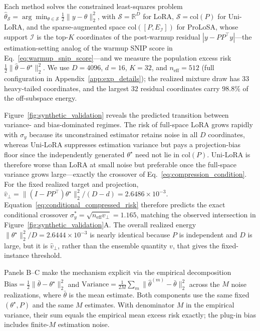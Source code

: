 Each method solves the constrained least-squares problem
\(\hat{\theta}_{\mathcal S}=\arg\min_{\theta\in\mathcal S}\frac{1}{2}\|y-\theta\|_2^2\),
with \(\mathcal S=\mathbb{R}^D\) for LoRA, \(\mathcal S=\mathrm{col}(P)\) for Uni-LoRA, and the sparse-augmented space \(\mathrm{col}([P,E_{\mathcal I}])\) for ProLoSA, whose support \(\mathcal I\) is the top-\(K\) coordinates of the post-warmup residual \(|y-PP^\top y|\)---the estimation-setting analog of the warmup SNIP score in Eq.~\eqref{eq:warmup_snip_score}---and we measure the population excess risk \(\frac{1}{2}\|\hat{\theta}-\theta^\star\|_2^2\).
We use \(D=4096\), \(d=16\), \(K=32\), and \(n_{\mathrm{eff}}=512\) (full configuration in Appendix~\ref{app:exp_details}); the realized mixture draw has \(33\) heavy-tailed coordinates, and the largest \(32\) residual coordinates carry \(98.8\%\) of the off-subspace energy.

Figure~\ref{fig:synthetic_validation} reveals the predicted transition between variance- and bias-dominated regimes. 
The risk of full-space LoRA grows rapidly with \(\sigma_y\) because its unconstrained estimator retains noise in all \(D\) coordinates, whereas Uni-LoRA suppresses estimation variance but pays a projection-bias floor since the independently generated \(\theta^\star\) need not lie in \(\mathrm{col}(P)\). 
Uni-LoRA is therefore worse than LoRA at small noise but preferable once the full-space variance grows large---exactly the crossover of Eq.~\eqref{eq:compression_condition}.
For the fixed realized target and projection,
$\hat v_\perp=\|(I-PP^\top)\theta^\star\|_2^2/(D-d)=2.6486\times10^{-3}$.
Equation~\eqref{eq:conditional_compressed_risk} therefore predicts the exact conditional crossover
$\sigma_y^\ast=\sqrt{n_{\mathrm{eff}}\hat v_\perp}=1.165$, matching the observed intersection in Figure~\ref{fig:synthetic_validation}A.
The overall realized energy $\|\theta^\star\|_2^2/D=2.6444\times10^{-3}$ is nearly identical because $P$ is independent and $D$ is large, but it is $\hat v_\perp$, rather than the ensemble quantity $v$, that gives the fixed-instance threshold.

Panels B--C make the mechanism explicit via the empirical decomposition
\(\mathrm{Bias}=\frac{1}{2}\|\bar{\theta}-\theta^\star\|_2^2\)
and
\(\mathrm{Variance}=\frac{1}{2M}\sum_{m}\|\hat{\theta}^{(m)}-\bar{\theta}\|_2^2\)
across the \(M\) noise realizations, where \(\bar{\theta}\) is the mean estimate.
Both components use the same fixed $(\theta^\star,P)$ and the same $M$ estimates. With denominator $M$ in the empirical variance, their sum equals the empirical mean excess risk exactly; the plug-in bias includes finite-$M$ estimation noise.

